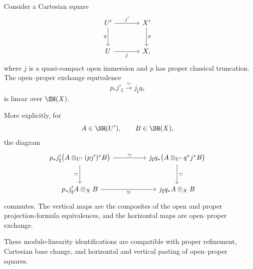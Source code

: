 \begin{lemma}
\label{lem:open-proper-exchange-module-linearity}
Consider a Cartesian square
\[
\begin{tikzcd}[column sep=large,row sep=large]
    U' \arrow[r,"j'"] \arrow[d,"q"']
        & X' \arrow[d,"p"] \\
    U \arrow[r,"j"']
        & X,
\end{tikzcd}
\]
where \(j\) is a quasi-compact open immersion and \(p\) has proper
classical truncation.  The open--proper exchange equivalence
\[
    p_*j'_\sharp
    \xrightarrow{\simeq}
    j_\sharp q_*
\]
is linear over \(\SH(X)\).

More explicitly, for
\[
    A\in\SH(U'),
    \qquad
    B\in\SH(X),
\]
the diagram
\[
\begin{tikzcd}[column sep=huge,row sep=large]
    p_*j'_\sharp
    \bigl(
      A\otimes_{U'}(pj')^*B
    \bigr)
        \arrow[r,"\simeq"]
        \arrow[d,"\simeq"']
        &
    j_\sharp q_*
    \bigl(
      A\otimes_{U'}q^*j^*B
    \bigr)
        \arrow[d,"\simeq"]
    \\
    p_*j'_\sharp A\otimes_XB
        \arrow[r,"\simeq"']
        &
    j_\sharp q_*A\otimes_XB
\end{tikzcd}
\]
commutes.  The vertical maps are the composites of the open and proper
projection-formula equivalences, and the horizontal maps are open--proper
exchange.

These module-linearity identifications are compatible with proper
refinement, Cartesian base change, and horizontal and vertical pasting of
open--proper squares.
\end{lemma}

